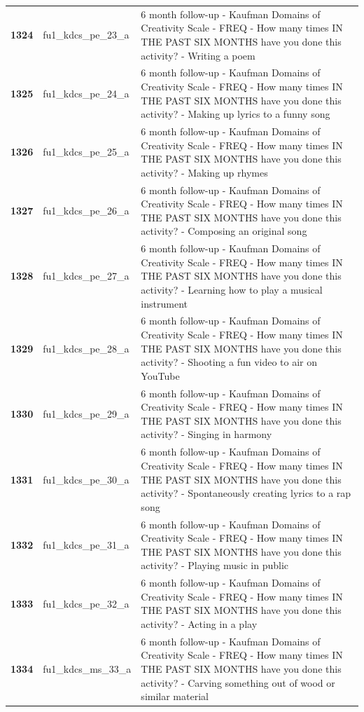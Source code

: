 \documentclass[
  letterpaper,
  DIV=11,
  numbers=noendperiod]{scrartcl}
\begin{document}
\begin{longtable}[t]{>{}cll}
\textbf{1324} & fu1\_kdcs\_pe\_23\_a & 6 month follow-up - Kaufman Domains of Creativity Scale - FREQ - How many times IN THE PAST SIX MONTHS have you done this activity? - Writing a poem\\
\textbf{1325} & fu1\_kdcs\_pe\_24\_a & 6 month follow-up - Kaufman Domains of Creativity Scale - FREQ - How many times IN THE PAST SIX MONTHS have you done this activity? - Making up lyrics to a funny song\\
\addlinespace
\textbf{1326} & fu1\_kdcs\_pe\_25\_a & 6 month follow-up - Kaufman Domains of Creativity Scale - FREQ - How many times IN THE PAST SIX MONTHS have you done this activity? - Making up rhymes\\
\textbf{1327} & fu1\_kdcs\_pe\_26\_a & 6 month follow-up - Kaufman Domains of Creativity Scale - FREQ - How many times IN THE PAST SIX MONTHS have you done this activity? - Composing an original song\\
\textbf{1328} & fu1\_kdcs\_pe\_27\_a & 6 month follow-up - Kaufman Domains of Creativity Scale - FREQ - How many times IN THE PAST SIX MONTHS have you done this activity? - Learning how to play a musical instrument\\
\textbf{1329} & fu1\_kdcs\_pe\_28\_a & 6 month follow-up - Kaufman Domains of Creativity Scale - FREQ - How many times IN THE PAST SIX MONTHS have you done this activity? - Shooting a fun video to air on YouTube\\
\textbf{1330} & fu1\_kdcs\_pe\_29\_a & 6 month follow-up - Kaufman Domains of Creativity Scale - FREQ - How many times IN THE PAST SIX MONTHS have you done this activity? - Singing in harmony\\
\addlinespace
\textbf{1331} & fu1\_kdcs\_pe\_30\_a & 6 month follow-up - Kaufman Domains of Creativity Scale - FREQ - How many times IN THE PAST SIX MONTHS have you done this activity? - Spontaneously creating lyrics to a rap song\\
\textbf{1332} & fu1\_kdcs\_pe\_31\_a & 6 month follow-up - Kaufman Domains of Creativity Scale - FREQ - How many times IN THE PAST SIX MONTHS have you done this activity? - Playing music in public\\
\textbf{1333} & fu1\_kdcs\_pe\_32\_a & 6 month follow-up - Kaufman Domains of Creativity Scale - FREQ - How many times IN THE PAST SIX MONTHS have you done this activity? - Acting in a play\\
\textbf{1334} & fu1\_kdcs\_ms\_33\_a & 6 month follow-up - Kaufman Domains of Creativity Scale - FREQ - How many times IN THE PAST SIX MONTHS have you done this activity? - Carving something out of wood or similar material\\

\end{longtable}
\end{document}
